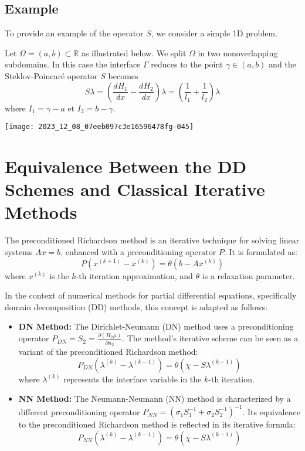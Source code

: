 \documentclass[11pt]{book}
\begin{document}
\subsection*{Example}
To provide an example of the operator $S$, we consider a simple 1D problem.

Let $\Omega=(a, b) \subset \mathbb{R}$ as illustrated below. We split $\Omega$ in two nonoverlapping subdomains. In this case the interface $\Gamma$ reduces to the point $\gamma \in(a, b)$ and the Steklov-Poincaré operator $S$ becomes
$$
S \lambda=\left(\frac{d H_{1}}{d x}-\frac{d H_{2}}{d x}\right) \lambda=\left(\frac{1}{l_{1}}+\frac{1}{l_{2}}\right) \lambda
$$
where $I_{1}=\gamma-a$ et $I_{2}=b-\gamma$.
\begin{center}
\texttt{[image: 2023\_12\_08\_07eeb097c3e16596478fg-045]}
\end{center}

\section*{Equivalence Between the DD Schemes and Classical Iterative Methods}
The preconditioned Richardson method is an iterative technique for solving linear systems $Ax = b$, enhanced with a preconditioning operator $P$. It is formulated as:
\begin{equation}
    P(x^{(k+1)} - x^{(k)}) = \theta (b - Ax^{(k)})
\end{equation}
where $x^{(k)}$ is the $k$-th iteration approximation, and $\theta$ is a relaxation parameter.

In the context of numerical methods for partial differential equations, specifically domain decomposition (DD) methods, this concept is adapted as follows:

\begin{itemize}
    \item \textbf{DN Method:} The Dirichlet-Neumann (DN) method uses a preconditioning operator $P_{DN} = S_2 = \frac{\partial(H_2\mu)}{\partial n_2}$. The method's iterative scheme can be seen as a variant of the preconditioned Richardson method:
    \begin{equation}
        P_{DN}(\lambda^{(k)} - \lambda^{(k-1)}) = \theta(\chi - S\lambda^{(k-1)})
    \end{equation}
    where $\lambda^{(k)}$ represents the interface variable in the $k$-th iteration.

    \item \textbf{NN Method:} The Neumann-Neumann (NN) method is characterized by a different preconditioning operator $P_{NN} = (\sigma_1 S_1^{-1} + \sigma_2 S_2^{-1})^{-1}$. Its equivalence to the preconditioned Richardson method is reflected in its iterative formula:
    \begin{equation}
        P_{NN}(\lambda^{(k)} - \lambda^{(k-1)}) = \theta(\chi - S\lambda^{(k-1)})
    \end{equation}
\end{itemize}
\end{document}
